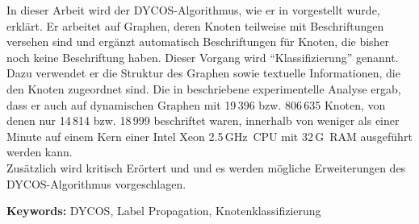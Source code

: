 In dieser Arbeit wird der DYCOS-Algorithmus, wie er in \cite{aggarwal2011}
vorgestellt wurde, erklärt. Er arbeitet auf Graphen, deren Knoten teilweise mit
Beschriftungen versehen sind und ergänzt automatisch Beschriftungen für Knoten,
die bisher noch keine Beschriftung haben. Dieser Vorgang wird
\enquote{Klassifizierung} genannt. Dazu verwendet er die Struktur des Graphen
sowie textuelle Informationen, die den Knoten zugeordnet sind. Die in
\cite{aggarwal2011} beschriebene experimentelle Analyse ergab, dass er auch auf
dynamischen Graphen mit 19\,396 bzw. 806\,635 Knoten, von denen nur
14\,814 bzw. 18\,999 beschriftet waren, innerhalb von weniger als
einer Minute auf einem Kern einer Intel Xeon 2.5\,GHz~CPU mit 32\,G~RAM
ausgeführt werden kann.\\
Zusätzlich wird \cite{aggarwal2011} kritisch Erörtert und und es werden
mögliche Erweiterungen des DYCOS-Algorithmus vorgeschlagen.

\textbf{Keywords:} DYCOS, Label Propagation, Knotenklassifizierung
